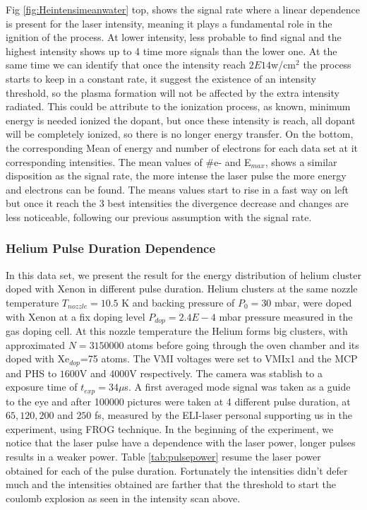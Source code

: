 Fig \ref{fig:Heintensimeanwater} top, shows the signal rate where a linear dependence is present for the laser intensity, meaning it  plays a fundamental role in the ignition of the process. At lower intensity, less probable to find signal and the highest intensity shows up to 4 time more signals than the lower one. At the same time we can identify that once the intensity reach $2E14$w/cm$^{2}$ the process starts to keep in a constant rate, it suggest the existence of  an intensity threshold, so the plasma formation will not be affected by the extra intensity radiated. This could be attribute to the ionization process, as known, minimum energy is needed ionized the dopant, but once these intensity is reach, all dopant will be completely ionized, so there is no longer energy transfer. 
On the bottom, the corresponding Mean of energy and number of electrons for each data set at it corresponding intensities. The mean values of $\#$e- and E$_{max}$, shows a  similar  disposition as the signal rate, the more intense the laser pulse the more energy and electrons can be found. The means values start to rise in a fast way on left but once it reach the 3 best intensities the divergence decrease and changes are less noticeable, following our previous assumption with the signal rate.

 
\subsubsection{Helium Pulse Duration Dependence}
 
In this data set, we present the result for the energy distribution of helium cluster doped with Xenon in different pulse duration.  Helium clusters at the same nozzle temperature $T_{nozzle}=10.5$ K and  backing pressure of $P_{0}=30$ mbar, were doped with Xenon at a fix doping level $P_{dop}=2.4E-4$ mbar pressure measured in the gas doping cell. At this nozzle temperature the Helium forms big clusters, with approximated $N=3150000$ atoms before going through the oven chamber and its doped with Xe$_{dop}$=75 atoms. The VMI voltages were set to VMIx1 and the MCP and PHS to $1600$V and $4000$V respectively. The camera was stablish to a exposure time of $t_{exp}=34 \mu$s. A first averaged mode signal was taken as a guide to the eye and after 100000 pictures were taken at 4 different pulse duration, at $65, 120, 200$ and $250$  fs, measured by the ELI-laser personal supporting us in the experiment, using FROG technique.
In the beginning of the experiment, we notice that the laser pulse have a dependence with the laser power,  longer pulses results in a weaker power. Table \ref{tab:pulsepower} resume the laser power obtained for each of the pulse duration. Fortunately the intensities didn't defer much and the intensities obtained are farther that the threshold to start the coulomb explosion as seen in the intensity scan above.
  
